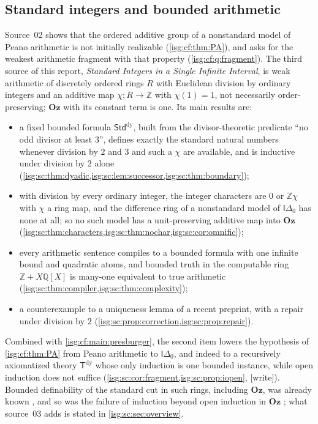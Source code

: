 \documentclass[11pt]{article}
\theoremstyle{definition}
\theoremstyle{remark}
\newcommand{\Oz}{\ensuremath{\mathbf{Oz}}}
\newcommand{\Z}{\mathbb{Z}}
\newcommand{\Q}{\mathbb{Q}}
\newcommand{\StdDy}{\mathsf{Std}^{\mathrm{dy}}}
\newcommand{\Tdy}{\mathsf{T}^{\mathrm{dy}}}
\newcommand{\Idelta}{\mathsf{I}\Delta_0}
\begin{document}
\subsection{Standard integers and bounded arithmetic}\label{isg:sc:sec:intro}
Source~02 shows that the ordered additive group of a nonstandard model of
Peano arithmetic is not initially realizable (\cref{isg:cf:thm:PA}), and
asks for the weakest arithmetic fragment with that property
(\cref{isg:cf:q:fragment}). The third source of this report,
\emph{Standard Integers in a Single Infinite Interval}, is weak
arithmetic of discretely ordered rings $R$ with Euclidean division by
ordinary integers and an additive map $\chi:R\to\Z$ with $\chi(1)=1$,
not necessarily order-preserving; $\Oz$ with its constant term is one.
Its main results are:
\begin{itemize}[leftmargin=*,itemsep=2pt]
\item a fixed bounded formula $\StdDy$, built from the divisor-theoretic
      predicate ``no odd divisor at least $3$'', defines exactly the
      standard natural numbers whenever division by $2$ and $3$ and such a
      $\chi$ are available, and is inductive under division by $2$ alone
      (\cref{isg:sc:thm:dyadic,isg:sc:lem:successor,isg:sc:thm:boundary});
\item with division by every ordinary integer, the integer characters
      are $0$ or $\Z\chi$ with $\chi$ a ring map, and the difference ring
      of a nonstandard model of $\Idelta$ has none at all; so no such
      model has a unit-preserving additive map into $\Oz$
      (\cref{isg:sc:thm:characters,isg:sc:thm:nochar,isg:sc:cor:omnific});
\item every arithmetic sentence compiles to a bounded formula with one
      infinite bound and quadratic atoms, and bounded truth in the
      computable ring $\Z+X\Q[X]$ is many-one equivalent to true
      arithmetic (\cref{isg:sc:thm:compiler,isg:sc:thm:complexity});
\item a counterexample to a uniqueness lemma of a recent preprint, with a
      repair under division by $2$ (\cref{isg:sc:prop:correction,isg:sc:prop:repair}).
\end{itemize}
Combined with \cref{isg:cf:main:presburger}, the second item lowers the
hypothesis of \cref{isg:cf:thm:PA} from Peano arithmetic to $\Idelta$, and
indeed to a recursively axiomatized theory $\Tdy$ whose only induction is
one bounded instance, while open induction does not suffice
(\cref{isg:sc:cor:fragment,isg:sc:prop:iopen}, \textup{[write]}). Bounded
definability of the standard cut in such rings, including $\Oz$, was
already known \cite[Theorem~2.9]{ELV}, and so was the failure of
induction beyond open induction in $\Oz$ \cite{JerabekMO}; what source~03
adds is stated in \cref{isg:sc:sec:overview}.
\end{document}
